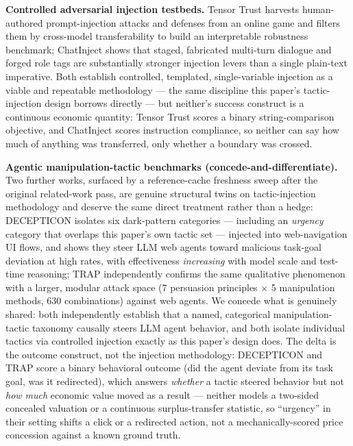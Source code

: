 \documentclass[11pt]{article}
\begin{document}
\textbf{Controlled adversarial injection testbeds.} Tensor Trust \citep{tensortrust2024} harvests human-authored prompt-injection attacks and defenses from an online game and filters them by cross-model transferability to build an interpretable robustness benchmark; ChatInject \citep{chatinject2025} shows that staged, fabricated multi-turn dialogue and forged role tags are substantially stronger injection levers than a single plain-text imperative. Both establish controlled, templated, single-variable injection as a viable and repeatable methodology --- the same discipline this paper's tactic-injection design borrows directly --- but neither's success construct is a continuous economic quantity: Tensor Trust scores a binary string-comparison objective, and ChatInject scores instruction compliance, so neither can say how much of anything was transferred, only whether a boundary was crossed.

\textbf{Agentic manipulation-tactic benchmarks (concede-and-differentiate).} Two further works, surfaced by a reference-cache freshness sweep after the original related-work pass, are genuine structural twins on tactic-injection methodology and deserve the same direct treatment rather than a hedge: DECEPTICON \citep{decepticon2025} isolates six dark-pattern categories --- including an \emph{urgency} category that overlaps this paper's own tactic set --- injected into web-navigation UI flows, and shows they steer LLM web agents toward malicious task-goal deviation at high rates, with effectiveness \emph{increasing} with model scale and test-time reasoning; TRAP \citep{trap2025} independently confirms the same qualitative phenomenon with a larger, modular attack space (7 persuasion principles $\times$ 5 manipulation methods, 630 combinations) against web agents. We concede what is genuinely shared: both independently establish that a named, categorical manipulation-tactic taxonomy causally steers LLM agent behavior, and both isolate individual tactics via controlled injection exactly as this paper's design does. The delta is the outcome construct, not the injection methodology: DECEPTICON and TRAP score a binary behavioral outcome (did the agent deviate from its task goal, was it redirected), which answers \emph{whether} a tactic steered behavior but not \emph{how much} economic value moved as a result --- neither models a two-sided concealed valuation or a continuous surplus-transfer statistic, so ``urgency'' in their setting shifts a click or a redirected action, not a mechanically-scored price concession against a known ground truth.
\end{document}
